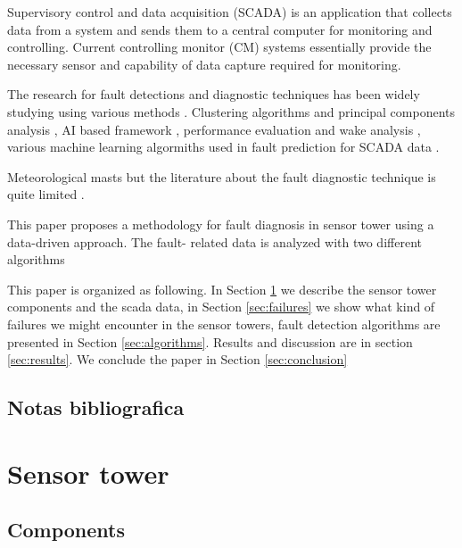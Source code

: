 \documentclass[journal]{IEEEtran}
\begin{document}
Supervisory control and data acquisition (SCADA) is an application that collects data from a system and sends them to a central computer for monitoring and controlling. Current controlling monitor (CM) systems essentially provide the necessary sensor and capability of data capture required for monitoring.

The research for  fault detections and diagnostic techniques has been widely studying using various methods \cite{tchakoua2014wind,wymore2015survey}. 
Clustering algorithms and principal components analysis \cite{kim2011use}, AI based framework \cite{wang2014scada}, performance evaluation and wake analysis \cite{astolfi2016mathematical}, various machine learning algormiths used in fault prediction for SCADA data \cite{kusiak2011prediction}.

Meteorological masts  
but the literature about the fault diagnostic technique is quite limited \cite{hasu2006weather} .


This paper proposes a methodology for fault diagnosis in sensor tower using a data-driven approach. The fault- related data is analyzed with two different algorithms

This paper is organized as following. In Section \ref{sec:sensortower} we describe the sensor tower components and the scada data, in Section \ref{sec:failures} we show what kind of failures we might encounter in the sensor towers, fault detection algorithms are presented in Section \ref{sec:algorithms}. Results and discussion are in section \ref{sec:results}. We conclude the paper in Section \ref{sec:conclusion}


\subsection{Notas bibliografica}





\cite{lu2009review}

\cite{schlechtingen2012condition}

\cite{schlechtingen2011comparative}

\cite{yang2014wind}




\section{Sensor tower}\label{sec:sensortower}
\subsection{Components}
\end{document}
